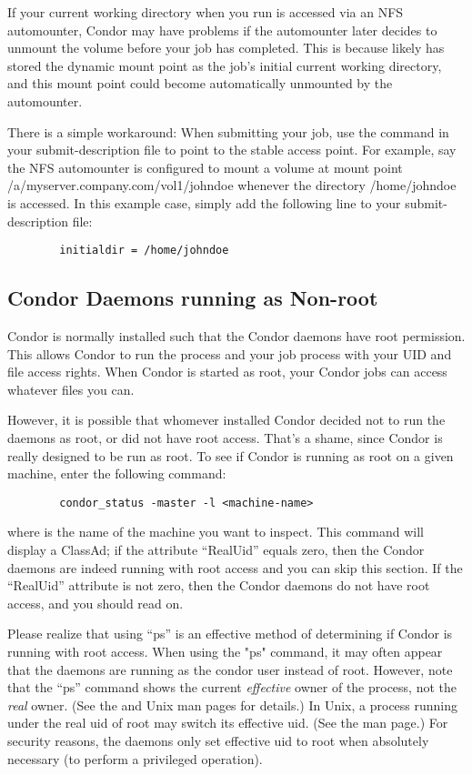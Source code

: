 If your current working directory when you run  is
accessed via an NFS automounter, Condor may have problems if the
automounter later decides to unmount the volume before your job has
completed.  This is because  likely has stored the
dynamic mount point as the job's initial current working directory, and
this mount point could become automatically unmounted by the
automounter.

There is a simple workaround: When submitting your job, use the 
 command in your submit-description file to point to
the stable access point.  For example,
say the NFS automounter is configured to mount a volume at mount point
/a/myserver.company.com/vol1/johndoe whenever the directory /home/johndoe is
accessed.  In this example case, simply add the following line to your 
submit-description file:
\begin{verbatim}
        initialdir = /home/johndoe
\end{verbatim}

\subsection{Condor Daemons running as Non-root}

Condor is normally installed such that the Condor daemons have root
permission.  This allows Condor to run the  process and
your job process with your UID and file access rights.  When Condor
is started as root, your Condor jobs can access whatever files you can.

However, it is possible that whomever installed Condor decided not to
run the daemons as root, or did not have root access.  That's a shame, 
since Condor is really designed to be run as root.  To see if Condor is
running as root on a given machine, enter the following command:
\begin{verbatim}
        condor_status -master -l <machine-name>
\end{verbatim}
where  is the name of the machine you want to inspect.
This command will display a  ClassAd; if the attribute ``RealUid'' equals
zero, then the Condor daemons are indeed running with root access and
you can skip this section.  If the ``RealUid'' attribute is not zero,
then the Condor daemons do not have root access, and you should read
on.

Please realize that using ``ps'' is
 an effective method of determining if Condor is running with
root access.  When using the "ps" command, it may often appear that the daemons are
running as the condor user instead of root.  However, note that the
``ps'' command shows the current \emph{effective}
owner of the process, not the \emph{real} owner.  (See the  and
 Unix man pages for details.)  In Unix, a process running
under the real uid of root may switch its effective uid.  (See the
 man page.)  For security reasons, the daemons only set effective uid to
root when absolutely necessary (to perform a privileged operation).

